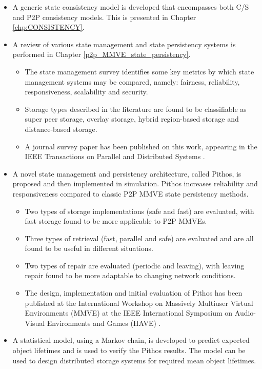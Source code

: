 \begin{itemize}
\item A generic state consistency model is developed that encompasses both C/S and P2P consistency models. This is presented in Chapter \ref{chp:CONSISTENCY}.

\item A review of various state management and state persistency systems is performed in Chapter \ref{p2p_MMVE_state_persistency}.
    \begin{itemize}
    \item The state management survey identifies some key metrics by which state management systems may be compared, namely: fairness, reliability, responsiveness, scalability and security.
    \item Storage types described in the literature are found to be classifiable as super peer storage, overlay storage, hybrid region-based storage and distance-based storage.
    \item A journal survey paper has been published on this work, appearing in the IEEE Transactions on Parallel and Distributed Systems \cite{gilmore_p2p_mmog_state_persistency}.
    \end{itemize}

\item A novel state management and persistency architecture, called Pithos, is proposed and then implemented in simulation. Pithos increases reliability and responsiveness compared to classic P2P MMVE state persistency methods.
    \begin{itemize}
    \item Two types of storage implementations (safe and fast) are evaluated, with fast storage found to be more applicable to P2P MMVEs.
    \item Three types of retrieval (fast, parallel and safe) are evaluated and are all found to be useful in different situations.
    \item Two types of repair are evaluated (periodic and leaving), with leaving repair found to be more adaptable to changing network conditions.
    \item The design, implementation and initial evaluation of Pithos has been published at the International Workshop on Massively Multiuser Virtual Environments (MMVE) at the IEEE International Symposium on Audio-Visual Environments and Games (HAVE) \cite{Pithos_mmve_2011}.
    \end{itemize}

\item A statistical model, using a Markov chain, is developed to predict expected object lifetimes and is used to verify the Pithos results. The model can be used to design distributed storage systems for required mean object lifetimes.
\end{itemize}

